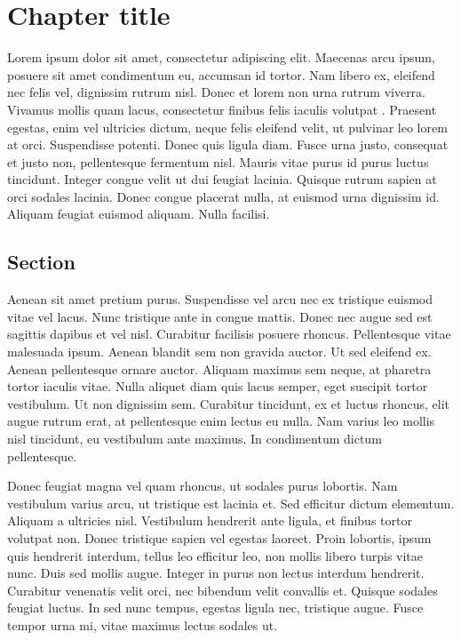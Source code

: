 
\chapter{Chapter title}

Lorem ipsum dolor sit amet, consectetur adipiscing elit. Maecenas arcu ipsum, posuere sit amet condimentum eu, accumsan id tortor. Nam libero ex, eleifend nec felis vel, dignissim rutrum nisl. Donec et lorem non urna rutrum viverra. Vivamus mollis quam lacus, consectetur finibus felis iaculis volutpat \cite{goossens93}. Praesent egestas, enim vel ultricies dictum, neque felis eleifend velit, ut pulvinar leo lorem at orci. Suspendisse potenti. Donec quis ligula diam. Fusce urna justo, consequat et justo non, pellentesque fermentum nisl. Mauris vitae purus id purus luctus tincidunt. Integer congue velit ut dui feugiat lacinia. Quisque rutrum sapien at orci sodales lacinia. Donec congue placerat nulla, at euismod urna dignissim id. Aliquam feugiat euismod aliquam. Nulla facilisi.

\section{Section}
Aenean sit amet pretium purus. Suspendisse vel arcu nec ex tristique euismod vitae vel lacus. Nunc tristique ante in congue mattis. Donec nec augue sed est sagittis dapibus et vel nisl. Curabitur facilisis posuere rhoncus. Pellentesque vitae malesuada ipsum. Aenean blandit sem non gravida auctor. Ut sed eleifend ex. Aenean pellentesque ornare auctor. Aliquam maximus sem neque, at pharetra tortor iaculis vitae. Nulla aliquet diam quis lacus semper, eget suscipit tortor vestibulum. Ut non dignissim sem. Curabitur tincidunt, ex et luctus rhoncus, elit augue rutrum erat, at pellentesque enim lectus eu nulla. Nam varius leo mollis nisl tincidunt, eu vestibulum ante maximus. In condimentum dictum pellentesque.

Donec feugiat magna vel quam rhoncus, ut sodales purus lobortis. Nam vestibulum varius arcu, ut tristique est lacinia et. Sed efficitur dictum elementum. Aliquam a ultricies nisl. Vestibulum hendrerit ante ligula, et finibus tortor volutpat non. Donec tristique sapien vel egestas laoreet. Proin lobortis, ipsum quis hendrerit interdum, tellus leo efficitur leo, non mollis libero turpis vitae nunc. Duis sed mollis augue. Integer in purus non lectus interdum hendrerit. Curabitur venenatis velit orci, nec bibendum velit convallis et. Quisque sodales feugiat luctus. In sed nunc tempus, egestas ligula nec, tristique augue. Fusce tempor urna mi, vitae maximus lectus sodales ut.
